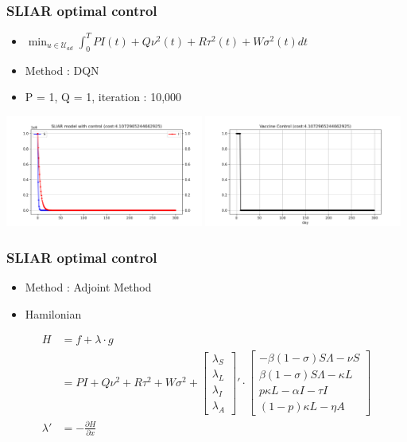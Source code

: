 \documentclass[usenames,dvipsnames, aspectratio=169, 9pt]{beamer}
\begin{document}
\begin{frame}\frametitle{SLIAR optimal control}
\begin{itemize}
\item $ \min_{u\in\mathcal{U}_{ad}} \int_0^T PI(t) + Q\nu^2(t) + R\tau^2(t) + W\sigma^2(t) dt$
\item Method : DQN
\item P = 1, Q = 1, iteration : 10,000
\end{itemize}
    \centering
    \includegraphics[width=6.5cm]{figure/sliar_dqn.png}
    \includegraphics[width=6.5cm]{figure/sliar_dqn_control.png}
\end{frame}


\begin{frame}\frametitle{SLIAR optimal control}
\begin{itemize}
    \item Method : Adjoint Method
    \item Hamilonian
\end{itemize}

\begin{align*}
    H &= f + \lambda\cdot g\\
     &= PI + Q\nu^2 + R\tau^2 + W\sigma^2 + {\begin{bmatrix}\lambda_S\\\lambda_L\\\lambda_I\\\lambda_A\end{bmatrix}}' \cdot \begin{bmatrix}-\beta (1-\sigma) S\Lambda - \nu S\\ \beta (1-\sigma) S\Lambda - \kappa L\\ p\kappa L - \alpha I - \tau I \\ (1-p)\kappa L - \eta A \end{bmatrix}\\
     \lambda' &= -\frac{\partial H}{\partial x} 
\end{align*}
\end{frame}
\end{document}
